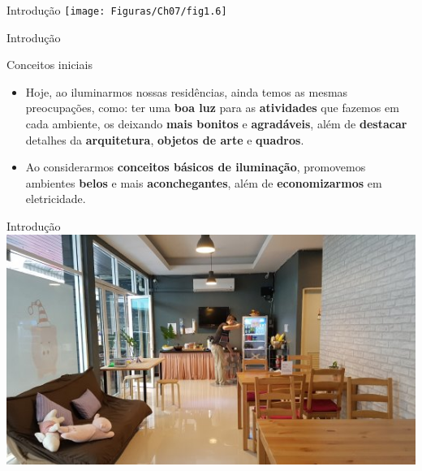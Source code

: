 \begin{frame}{Introdução}
	\centering
	\texttt{[image: Figuras/Ch07/fig1.6]}
\end{frame}


\begin{frame}{Introdução}
	\begin{block}{Conceitos iniciais}
		\begin{itemize}
			\item Hoje, ao iluminarmos nossas residências, ainda temos as mesmas preocupações, como: ter uma \textbf{boa luz} para as \textbf{atividades} que fazemos em cada ambiente, os deixando \textbf{mais bonitos} e \textbf{agradáveis}, além de \textbf{destacar} detalhes da \textbf{arquitetura}, \textbf{objetos de arte} e \textbf{quadros}.
			\item Ao considerarmos \textbf{conceitos básicos de iluminação}, promovemos ambientes \textbf{belos} e mais \textbf{aconchegantes}, além de \textbf{economizarmos} em eletricidade.
		\end{itemize}
	\end{block}
\end{frame}


\begin{frame}{Introdução}
	\centering
	\includegraphics[width=1\linewidth]{Figuras/Ch07/fig1.7}
\end{frame}


